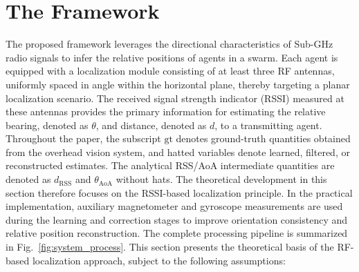 \documentclass[subscriptcorrection,upint,varvw,barcolor=Goldenrod3,mathalfa=cal=euler,balance,hyphenate,pdf-a]{asmejour}
\begin{document}
\section{The Framework}
The proposed framework leverages the directional characteristics of Sub-GHz radio signals to infer the relative positions of agents in a swarm. Each agent is equipped with a localization module consisting of at least three RF antennas, uniformly spaced in angle within the horizontal plane, thereby targeting a planar localization scenario. The received signal strength indicator (RSSI) measured at these antennas provides the primary information for estimating the relative bearing, denoted as $\theta$, and distance, denoted as $d$, to a transmitting agent. Throughout the paper, the subscript $\mathrm{gt}$ denotes ground-truth quantities obtained from the overhead vision system, and hatted variables denote learned, filtered, or reconstructed estimates. The analytical RSS/AoA intermediate quantities are denoted as $d_{\mathrm{RSS}}$ and $\theta_{\mathrm{AoA}}$ without hats. The theoretical development in this section therefore focuses on the RSSI-based localization principle. In the practical implementation, auxiliary magnetometer and gyroscope measurements are used during the learning and correction stages to improve orientation consistency and relative position reconstruction. The complete processing pipeline is summarized in Fig.~\ref{fig:system_process}. This section presents the theoretical basis of the RF-based localization approach, subject to the following assumptions:
\end{document}
